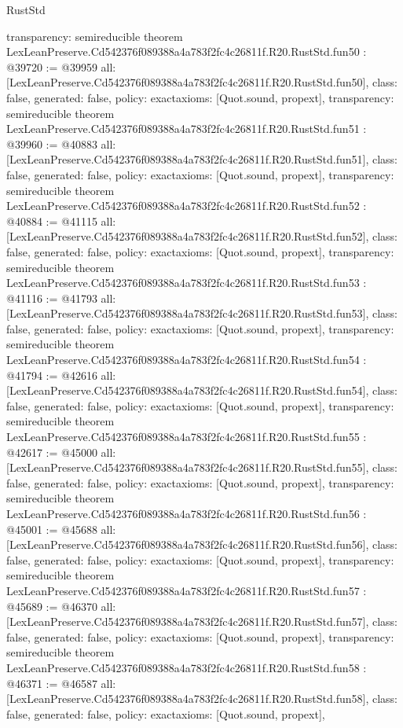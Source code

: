 \begin{lexlean}{RustStd}
\begin{coremodule}
{  transparency: semireducible
}
theorem LexLeanPreserve.Cd542376f089388a4a783f2fc4c26811f.R20.RustStd.fun50 : @39720 := @39959 {
  all: [LexLeanPreserve.Cd542376f089388a4a783f2fc4c26811f.R20.RustStd.fun50],
  class: false,
  generated: false,
  policy: exact{axioms: [Quot.sound, propext]},
  transparency: semireducible
}
theorem LexLeanPreserve.Cd542376f089388a4a783f2fc4c26811f.R20.RustStd.fun51 : @39960 := @40883 {
  all: [LexLeanPreserve.Cd542376f089388a4a783f2fc4c26811f.R20.RustStd.fun51],
  class: false,
  generated: false,
  policy: exact{axioms: [Quot.sound, propext]},
  transparency: semireducible
}
theorem LexLeanPreserve.Cd542376f089388a4a783f2fc4c26811f.R20.RustStd.fun52 : @40884 := @41115 {
  all: [LexLeanPreserve.Cd542376f089388a4a783f2fc4c26811f.R20.RustStd.fun52],
  class: false,
  generated: false,
  policy: exact{axioms: [Quot.sound, propext]},
  transparency: semireducible
}
theorem LexLeanPreserve.Cd542376f089388a4a783f2fc4c26811f.R20.RustStd.fun53 : @41116 := @41793 {
  all: [LexLeanPreserve.Cd542376f089388a4a783f2fc4c26811f.R20.RustStd.fun53],
  class: false,
  generated: false,
  policy: exact{axioms: [Quot.sound, propext]},
  transparency: semireducible
}
theorem LexLeanPreserve.Cd542376f089388a4a783f2fc4c26811f.R20.RustStd.fun54 : @41794 := @42616 {
  all: [LexLeanPreserve.Cd542376f089388a4a783f2fc4c26811f.R20.RustStd.fun54],
  class: false,
  generated: false,
  policy: exact{axioms: [Quot.sound, propext]},
  transparency: semireducible
}
theorem LexLeanPreserve.Cd542376f089388a4a783f2fc4c26811f.R20.RustStd.fun55 : @42617 := @45000 {
  all: [LexLeanPreserve.Cd542376f089388a4a783f2fc4c26811f.R20.RustStd.fun55],
  class: false,
  generated: false,
  policy: exact{axioms: [Quot.sound, propext]},
  transparency: semireducible
}
theorem LexLeanPreserve.Cd542376f089388a4a783f2fc4c26811f.R20.RustStd.fun56 : @45001 := @45688 {
  all: [LexLeanPreserve.Cd542376f089388a4a783f2fc4c26811f.R20.RustStd.fun56],
  class: false,
  generated: false,
  policy: exact{axioms: [Quot.sound, propext]},
  transparency: semireducible
}
theorem LexLeanPreserve.Cd542376f089388a4a783f2fc4c26811f.R20.RustStd.fun57 : @45689 := @46370 {
  all: [LexLeanPreserve.Cd542376f089388a4a783f2fc4c26811f.R20.RustStd.fun57],
  class: false,
  generated: false,
  policy: exact{axioms: [Quot.sound, propext]},
  transparency: semireducible
}
theorem LexLeanPreserve.Cd542376f089388a4a783f2fc4c26811f.R20.RustStd.fun58 : @46371 := @46587 {
  all: [LexLeanPreserve.Cd542376f089388a4a783f2fc4c26811f.R20.RustStd.fun58],
  class: false,
  generated: false,
  policy: exact{axioms: [Quot.sound, propext]},
}
\end{coremodule}
\end{lexlean}

